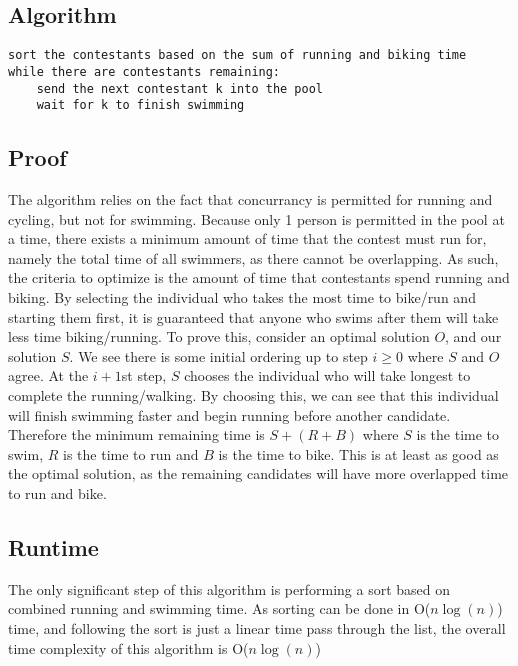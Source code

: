 \documentclass[titlepage]{article}
\numberwithin{equation}{subsection}
\begin{document}
\subsection{Algorithm}
\begin{lstlisting}
sort the contestants based on the sum of running and biking time
while there are contestants remaining:
    send the next contestant k into the pool
    wait for k to finish swimming
\end{lstlisting}
\subsection{Proof}
The algorithm relies on the fact that concurrancy is permitted for
running and cycling, but not for swimming. Because only 1 person is
permitted in the pool at a time, there exists a minimum amount of
time that the contest must run for, namely the total time of all
swimmers, as there cannot be overlapping. As such, the criteria to
optimize is the amount of time that contestants spend running and
biking. By selecting the individual who takes the most time to bike/run
and starting them first, it is guaranteed that anyone who swims after them
will take less time biking/running. To prove this, consider an optimal solution $O$,
and our solution $S$. We see there is some initial ordering up to step $i \geq 0$
where $S$ and $O$ agree. At the $i+1$st step, $S$ chooses the individual who
will take longest to complete the running/walking. By choosing this, we can
see that this individual will finish swimming faster and begin running before
another candidate. Therefore the minimum remaining time is $S+(R+B)$ where 
$S$ is the time to swim, $R$ is the time to run and $B$ is the time to bike.
This is at least as good as the optimal solution, as the remaining candidates will
have more overlapped time to run and bike.
\subsection{Runtime}
The only significant step of this algorithm is performing a sort based on
combined running and swimming time. As sorting can be done in O($n\log(n)$) time,
and following the sort is just a linear time pass through the list, the
overall time complexity of this algorithm is O($n\log(n)$)
\section{}
\end{document}
